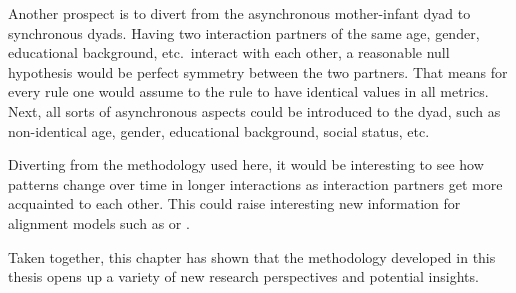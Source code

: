 Another prospect is to divert from the asynchronous mother-infant dyad to synchronous dyads.
Having two interaction partners of the same age, gender, educational background, etc.\ interact with each other, a reasonable null hypothesis would be perfect symmetry between the two partners.
That means for every rule  one would assume to the rule  to have identical values in all metrics.
Next, all sorts of asynchronous aspects could be introduced to the dyad, such as non-identical age, gender, educational background, social status, etc.

Diverting from the methodology used here, it would be interesting to see how patterns change over time in longer interactions as interaction partners get more acquainted to each other.
This could raise interesting new information for alignment models such as \citet{fusaroli_dialog_2014} or \citet{reitter_alignment_2014}.

Taken together, this chapter has shown that the methodology developed in this thesis opens up a variety of new research perspectives and potential insights.
